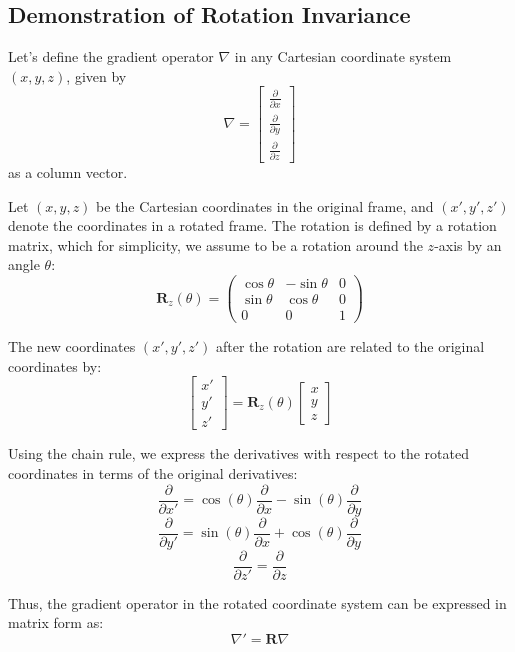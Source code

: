\noindent
\subsection{Demonstration of Rotation Invariance}
\label{invariance}

\noindent
Let's define the gradient operator $\nabla$ in any Cartesian  
coordinate system $(x, y, z)$, given by 
\[
\nabla = 
\begin{bmatrix} 
\frac{\partial}{\partial x} \\ 
\frac{\partial}{\partial y} \\
\frac{\partial}{\partial z}
\end{bmatrix}
\]
as a column vector.

\noindent
Let \( (x, y, z) \) be the Cartesian coordinates in the original frame, 
and \( (x', y', z') \) denote the coordinates in a rotated frame. 
The rotation is defined by a rotation matrix, which for simplicity, 
we assume to be a rotation around the \( z \)-axis by an angle \( \theta \):
\[
\mathbf{R}_z(\theta) = 
\begin{pmatrix}
\cos \theta & -\sin \theta & 0 \\
\sin \theta & \cos \theta & 0 \\
0 & 0 & 1
\end{pmatrix}
\]

\noindent
The new coordinates $(x', y', z')$ after the rotation are related to 
the original coordinates by:
\[
\begin{bmatrix} 
x' \\ 
y' \\
z'
\end{bmatrix} 
= 
\mathbf{R}_z(\theta)
\begin{bmatrix} 
x \\ 
y \\
z
\end{bmatrix}
\]

\noindent
Using the chain rule, we express the derivatives with respect to the rotated coordinates 
in terms of the original derivatives: 
\[
\frac{\partial}{\partial x'} = \cos(\theta) \frac{\partial}{\partial x} 
- \sin(\theta) \frac{\partial}{\partial y}
\]
\[
\frac{\partial}{\partial y'} = \sin(\theta) \frac{\partial}{\partial x} 
+ \cos(\theta) \frac{\partial}{\partial y}
\]
\[
\frac{\partial}{\partial z'} = \frac{\partial}{\partial z}
\]

\noindent
Thus, the gradient operator in the rotated coordinate system 
can be expressed in matrix form as:
\begin{equation}
\nabla' 
= 
\mathbf{R} \nabla
\label{eq:gradient_rotated}
\end{equation}

